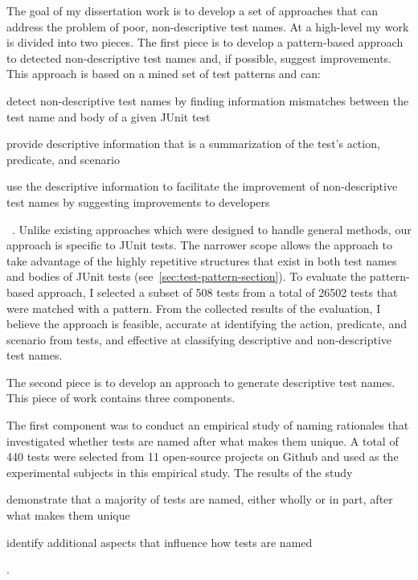 The goal of my dissertation work is to develop a set of approaches that can address the problem of poor, non-descriptive test names.
%
At a high-level my work is divided into two pieces.
%
The first piece is to develop a pattern-based approach to detected non-descriptive test names and, if possible, suggest improvements.
%
This approach is based on a mined set of test patterns and can:
%
\begin{enumerate*}
\item detect non-descriptive test names by finding information mismatches between the test name and body of a given JUnit test
\item provide descriptive information that is a summarization of the test's action, predicate, and scenario
\item use the descriptive information to facilitate the improvement of non-descriptive test names by suggesting improvements to developers
\end{enumerate*}~\cite{wu2020pattern}.
%
Unlike existing approaches which were designed to handle general methods, our approach is specific to JUnit tests.
%
The narrower scope allows the approach to take advantage of the highly repetitive structures that exist in both test names and bodies of JUnit tests (see~\cref{sec:test-pattern-section}).
% 
To evaluate the pattern-based approach, I selected a subset of \num{508} tests from a total of \num{26502} tests that were matched with a pattern.
%
From the collected results of the evaluation, I believe the approach is feasible, accurate at identifying the action, predicate, and
scenario from tests, and effective at classifying descriptive and
non-descriptive test names.


The second piece is to develop an approach to generate descriptive test names.
% 
This piece of work contains three components.

The first component was to conduct an empirical study of naming rationales that investigated whether tests are named after what makes them unique.
%
A total of \num{440} tests were selected from \num{11} open-source projects on Github and used as the experimental subjects in this empirical study.
%
The results of the study
\begin{enumerate*}
\item demonstrate that a majority of tests are named, either wholly or in part, after what makes them unique
\item identify additional aspects that influence how tests are named
\end{enumerate*}.


